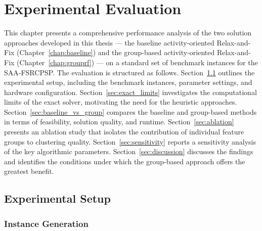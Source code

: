 %

\chapter{Experimental Evaluation}
\label{chap:experiments}

This chapter presents a comprehensive performance analysis of
the two solution approaches developed in this thesis — the
baseline activity-oriented Relax-and-Fix
(Chapter~\ref{chap:baseline}) and the group-based
activity-oriented Relax-and-Fix (Chapter~\ref{chap:grouprf}) —
on a standard set of benchmark instances for the SAA-FSRCPSP\@.
The evaluation is structured as follows.
Section~\ref{sec:setup} outlines the experimental setup,
including the benchmark instances, parameter settings, and
hardware configuration.
Section~\ref{sec:exact_limits} investigates the computational
limits of the exact solver, motivating the need for the
heuristic approaches.
Section~\ref{sec:baseline_vs_group} compares the baseline and
group-based methods in terms of feasibility, solution quality,
and runtime.
Section~\ref{sec:ablation} presents an ablation study that
isolates the contribution of individual feature groups to
clustering quality.
Section~\ref{sec:sensitivity} reports a sensitivity analysis
of the key algorithmic parameters.
Section~\ref{sec:discussion} discusses the findings and
identifies the conditions under which the group-based approach
offers the greatest benefit.


\section{Experimental Setup}
\label{sec:setup}

\subsection{Instance Generation}
\label{subsec:instances}

